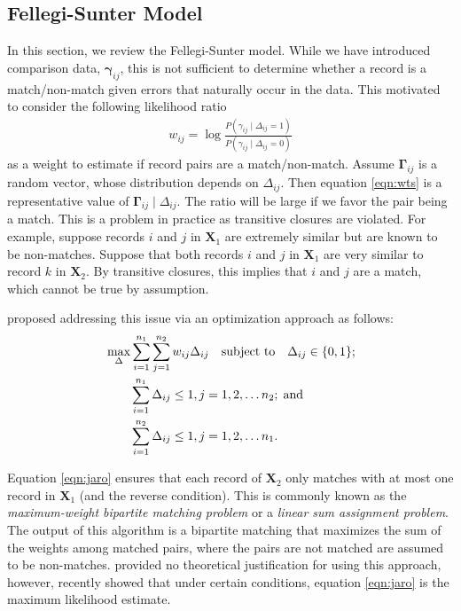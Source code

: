 \documentclass[12pt,letterpaper]{article}
\newcommand{\1}[1]{\mathbb{I}\!\left[#1\right]} %
\begin{document}
\subsection{Fellegi-Sunter Model}
In this section, we review the Fellegi-Sunter model. While we have introduced comparison data, $\bm{\gamma}_{ij}$, this is not sufficient to determine whether a record is a match/non-match given errors that naturally occur in the data. This motivated \cite{fellegi_theory_1969} to consider the following likelihood ratio
\begin{align}
\label{eqn:wts}
w_{ij} = \log \frac{P(\gamma_{ij} \mid \Delta_{ij} = 1)}{P(\gamma_{ij} \mid \Delta_{ij} = 0)}
\end{align}
as a weight to estimate if record pairs are a match/non-match. Assume $\bm{\Gamma}_{ij}$ is a random vector, whose distribution depends on $\Delta_{ij}.$ Then equation \ref{eqn:wts} is a representative value of $\bm{\Gamma}_{ij} \mid \Delta_{ij}.$ The ratio will be large if we favor the pair being a match. This is a problem in practice as transitive closures are violated. For example, suppose records $i$ and $j$ in $\bm{X}_1$ are extremely similar but are known to be non-matches. Suppose that both records $i$ and $j$ in $\bm{X}_1$ are very similar to record $k$ in $\bm{X}_2.$ By transitive closures, this implies that $i$ and $j$ are a match, which cannot be true by assumption. 

\cite{jaro1989} proposed addressing this issue via an optimization approach as follows:
\begin{align}
\label{eqn:jaro}
&\max_{\Delta} \sum_{i=1}^{n_1} \sum_{j=1}^{n_2} w_{ij} \Delta_{ij} 
\quad \text{subject to} \quad \Delta_{ij} \in \{0,1\}; \\
& \quad \quad \sum_{i=1}^{n_1}  \Delta_{ij}  \leq 1, j=1,2, \ldots n_2; \; \text{and} \notag\\
& \quad \quad\sum_{i=1}^{n_2}  \Delta_{ij}  \leq 1, j=1,2, \ldots n_1. \notag
\end{align}

Equation \ref{eqn:jaro} ensures that each record of $\bm{X}_2$ only matches with at most one record in $\bm{X}_1$ (and the reverse condition). This is commonly known as the \emph{maximum-weight bipartite matching problem} or a \emph{linear sum assignment problem}. The output of this algorithm is a bipartite matching that maximizes the sum of the weights among matched pairs, where the pairs are not matched are assumed to be non-matches. \cite{jaro1989} provided no theoretical justification for using this approach, however, \cite{sadinle_bayesian_2017} recently showed that under certain conditions, equation \ref{eqn:jaro} is the maximum likelihood estimate. 
\end{document}
